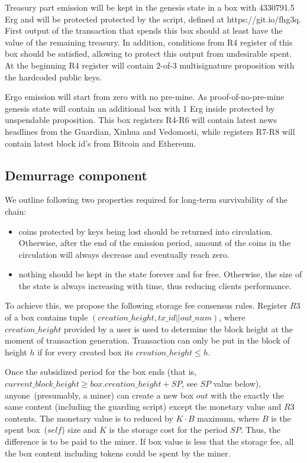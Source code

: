 Treasury part emission will be kept in the genesis state in a box with 4330791.5 Erg and
will be protected protected by the script, defined at https://git.io/fhg3q.
First output of the transaction that spends this box should at least have the value of the
remaining treasury.
In addition, conditions from R4 register of this box should be satisfied,
allowing to protect this output from undesirable spent.
At the beginning R4 register will contain 2-of-3
multisignature proposition with the hardcoded public keys.

Ergo emission will start from zero with no pre-mine. As proof-of-no-pre-mine genesis state
will contain an additional box with 1 Erg inside protected by unspendable proposition.
This box registers R4-R6 will contain latest news headlines from the Guardian, Xinhua and Vedomosti,
while registers R7-R8 will contain latest block id's from Bitcoin and Ethereum.

\subsection{Demurrage component}

We outline following two properties required for long-term survivability of the chain:

\begin{itemize}
    \item{} coins protected by keys being lost should be returned into circulation.
    Otherwise, after the end of the emission period, amount of the coins
    in the circulation will always decrease and eventually reach zero.
    \item{} nothing should be kept in the state forever and for free.
    Otherwise, the size of the state is always increasing with time, thus reducing clients performance.
\end{itemize}

To achieve this, we propose the following storage fee consensus rules.
Register $R3$ of a box contains tuple $(creation\_height, tx\_id || out\_num)$, where $creation\_height$ provided by a user
is used to determine the block height at the moment of transaction generation.
Transaction can only be put in the block of height $h$ if for every created box its $creation\_height \le h$.

Once the subsidized period for the box ends (that is,
$current\_block\_height \ge box.creation\_height + SP$, see $SP$ value below), anyone~(presumably, a miner) can
create a new box $out$ with the exactly the same content (including the guarding
script) except the monetary value and $R3$ contents. The monetary value is to
reduced by $K \cdot B$ maximum, where $B$ is the spent box~($self$)
size and $K$ is the storage cost for the period $SP$. Thus, the difference is to be paid to the miner.
If box value is less that the storage fee, all the box content including tokens could be spent by the miner.

